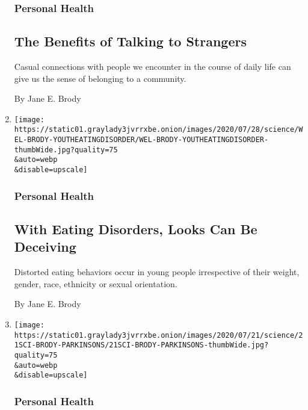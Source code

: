 \begin{enumerate}
  \hypertarget{personal-health-5}{%
  \subsubsection{Personal Health}\label{personal-health-5}}

  \hypertarget{the-benefits-of-talking-to-strangers}{%
  \subsection{The Benefits of Talking to
  Strangers}\label{the-benefits-of-talking-to-strangers}}

  Casual connections with people we encounter in the course of daily
  life can give us the sense of belonging to a community.

  By Jane E. Brody
\item
  \href{/2020/07/27/well/eat/eating-disorders.html}{}

  \texttt{[image: https://static01.graylady3jvrrxbe.onion/images/2020/07/28/science/WEL-BRODY-YOUTHEATINGDISORDER/WEL-BRODY-YOUTHEATINGDISORDER-thumbWide.jpg?quality=75\\\&auto=webp\\\&disable=upscale]}

  \hypertarget{personal-health-6}{%
  \subsubsection{Personal Health}\label{personal-health-6}}

  \hypertarget{with-eating-disorders-looks-can-be-deceiving}{%
  \subsection{With Eating Disorders, Looks Can Be
  Deceiving}\label{with-eating-disorders-looks-can-be-deceiving}}

  Distorted eating behaviors occur in young people irrespective of their
  weight, gender, race, ethnicity or sexual orientation.

  By Jane E. Brody
\item
  \href{/2020/07/20/well/live/parkinsons-disease-toxic-chemicals.html}{}

  \texttt{[image: https://static01.graylady3jvrrxbe.onion/images/2020/07/21/science/21SCI-BRODY-PARKINSONS/21SCI-BRODY-PARKINSONS-thumbWide.jpg?quality=75\\\&auto=webp\\\&disable=upscale]}

  \hypertarget{personal-health-7}{%
  \subsubsection{Personal Health}\label{personal-health-7}}


\end{enumerate}
